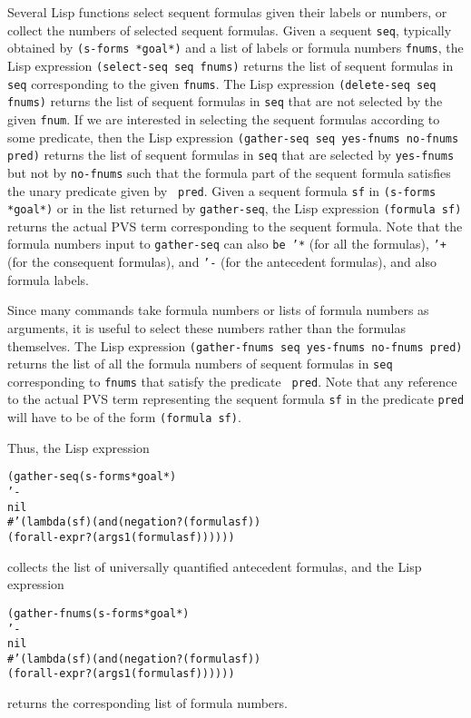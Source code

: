 \documentclass[12pt,twoside]{book}
\begin{document}
 Several Lisp functions  select sequent formulas
given their labels or numbers, or collect the numbers 
of selected sequent formulas.  Given a sequent \texttt{seq}, typically obtained
by \texttt{(s-forms *goal*)} and a list of labels or formula
numbers \texttt{fnums},  the Lisp expression \texttt{(select-seq seq fnums)}
returns the list of sequent formulas in \texttt{seq} corresponding to the
given \texttt{fnums}\@.  The Lisp expression \texttt{(delete-seq seq fnums)}
returns the list of sequent formulas in \texttt{seq} that are not
selected by the given \texttt{fnum}\@.  If we are interested in
selecting the sequent formulas according to some predicate, then
the Lisp expression \texttt{(gather-seq seq yes-fnums no-fnums pred)}
returns the list of sequent formulas in \texttt{seq} that are selected
by \texttt{yes-fnums} but not by \texttt{no-fnums} such that the formula part
of the sequent formula satisfies the unary predicate given by {\tt
pred}\@.  Given a sequent formula \texttt{sf} in \texttt{(s-forms *goal*)} or in the list returned by \texttt{gather-seq}, the Lisp expression
\texttt{(formula sf)} returns the actual PVS term corresponding to the
sequent formula.  Note that the formula numbers input to \texttt{gather-seq}
can also \texttt{be '*} (for all the formulas), \texttt{'+} (for the
consequent formulas), and \texttt{'-} (for the antecedent formulas),
and also formula labels. 

Since many commands take  formula numbers or lists of formula numbers as
arguments, it is useful to select these numbers rather than the formulas
themselves.  The Lisp expression \texttt{(gather-fnums seq yes-fnums no-fnums
pred)} returns the list of all the formula numbers of sequent formulas in
\texttt{seq} corresponding to \texttt{fnums} that satisfy the predicate {\tt
pred}\@.  Note that any reference to the actual PVS term representing
the sequent formula \texttt{sf} in the predicate \texttt{pred} will have to be
of the form \texttt{(formula sf)}\@.  


Thus, the Lisp expression
\begin{alltt}
  (gather-seq (s-forms *goal*)
              '-
              nil
              \#'(lambda (sf) (and (negation? (formula sf))
                               (forall-expr? (args1 (formula sf))))))
\end{alltt}
collects the list of universally quantified
antecedent formulas, and the Lisp expression
\begin{alltt}
  (gather-fnums (s-forms *goal*)
                '-
                nil
              \#'(lambda (sf) (and (negation? (formula sf))
                               (forall-expr? (args1 (formula sf))))))
\end{alltt}
returns the corresponding list of formula numbers.
\end{document}
